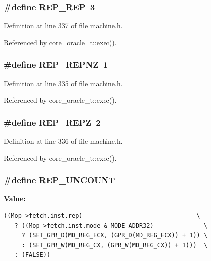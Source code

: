 \subsubsection[{REP\_\-REP}]{\setlength{\rightskip}{0pt plus 5cm}\#define REP\_\-REP~3}\label{machine_8h_2da96452a4c6418f9b9bbc1227e49f00}




Definition at line 337 of file machine.h.

Referenced by core\_\-oracle\_\-t::exec().
\subsubsection[{REP\_\-REPNZ}]{\setlength{\rightskip}{0pt plus 5cm}\#define REP\_\-REPNZ~1}\label{machine_8h_1fd5635eb03573f5a1618af1152d1fda}




Definition at line 335 of file machine.h.

Referenced by core\_\-oracle\_\-t::exec().
\subsubsection[{REP\_\-REPZ}]{\setlength{\rightskip}{0pt plus 5cm}\#define REP\_\-REPZ~2}\label{machine_8h_1b0eb3c76214aef658830a2c081bbf90}




Definition at line 336 of file machine.h.

Referenced by core\_\-oracle\_\-t::exec().
\subsubsection[{REP\_\-UNCOUNT}]{\setlength{\rightskip}{0pt plus 5cm}\#define REP\_\-UNCOUNT}\label{machine_8h_2df217ce5f174939979768bd4f7a08c2}


\textbf{Value:}

\begin{Code}\begin{verbatim}((Mop->fetch.inst.rep)                                \
   ? ((Mop->fetch.inst.mode & MODE_ADDR32)              \
     ? (SET_GPR_D(MD_REG_ECX, (GPR_D(MD_REG_ECX)) + 1)) \
     : (SET_GPR_W(MD_REG_CX, (GPR_W(MD_REG_CX)) + 1)))  \
   : (FALSE))
\end{verbatim}
\end{Code}


